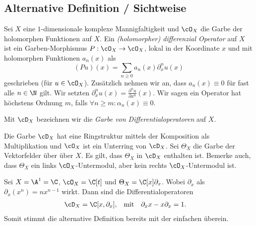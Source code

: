 \subsection{Alternative Definition / Sichtweise}
\begin{comment}
Nur abgeschrieben
\end{comment}
\cite[Chap 1.1.]{kashiwara2003d}
Sei $X$ eine $1$-dimensionale komplexe Mannigfaltigkeit und $\cO_X$ die Garbe
der holomorphen Funktionen auf $X$. Ein \emph{(holomorpher) differenzial
Operator} auf $X$ ist ein Garben-Morphismus $P:\cO_X\rightarrow \cO_X$, lokal
in der Koordinate $x$ und mit holomorphen Funktionen $a_n(x)$ als
\[
(Pu)(x)=\sum_{n\geq0}a_n(x)\partial_x^nu(x)
\]
geschrieben (für $u\in\cO_X$). Zusätzlich nehmen wir an, dass $a_n(x)\equiv 0$
für fast alle $n\in \N$ gilt. Wir setzten
$\partial_x^nu(x)=\frac{\partial^nu}{\partial x^n}(x)$. Wir sagen ein Operator
hat höchstens Ordnung $m$, falls $\forall n\geq m: \alpha_n(x)\equiv0$.
\begin{defn}
Mit $\cD_X$ bezeichnen wir die \emph{Garbe von Differentialoperatoren} auf $X$.
\end{defn}
Die Garbe $\cD_X$ hat eine Ringstruktur mittels der Komposition als
Multiplikation und $\cO_X$ ist ein Unterring von $\cD_X$. Sei $\Theta_X$ die
Garbe der Vektorfelder über über $X$. Es gilt, dass $\Theta_X$ in $\cD_X$
enthalten ist.  Bemerke auch, dass $\Theta_X$ ein links $\cO_X$-Untermodul,
aber kein rechts $\cO_X$-Untermodul ist.

\begin{prop}
\cite[Exmp 1.1]{ArkhipovDmod}
Sei $X=\A^1=\C$, $\cO_X=\C[t]$ und $\Theta_X=\C[x]\partial_x$. Wobei $\partial_x$
als $\partial_x(x^n)=nx^{n-1}$ wirkt. Dann sind die Differentialoperatoren
\begin{align*}
\cD_X &= \C[x,\partial_x], & \mbox{mit} & & \partial_x x-x\partial_x & =1.
\end{align*}
Somit stimmt die alternative Definition bereits mit der einfachen überein.
\end{prop}

\begin{comment}
\begin{defn} \cite[Defn 2.1]{ArkhipovDmod}
Sei $X=\A^1$, $\cO_X=\C[x]$ und $\cD_X=[x,\partial_x]$ mit der Relation
$[\partial_x,x]=1$. Dann definieren wir die links $\cD$-Moduln über $\A^1$ als
die $\C[x,\partial_x]$-Moduln. Sie werden geschrieben als $\cD-mod(\A^1)$
\end{defn}
\end{comment}

